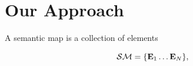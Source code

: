 \documentclass{article}
\begin{document}
	\clearpage
	
	
	
	\clearpage

	\section{Our Approach}
	
%	
%	
%		
%		
%		
%		
%		
%		
%		

	A semantic map is a collection of elements
	
	\begin{equation}
	\mathcal{SM} = \{ \mathbf{E}_1 \dots \mathbf{E}_N \},
	\end{equation}
	
\end{document}
